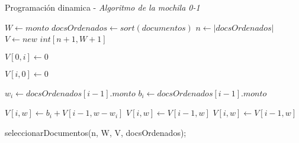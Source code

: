 \begin{algorithm}
    \caption{\label{fig: algortimoMochila}Programación dinamica - \textit{Algoritmo de la mochila 0-1}}
    \begin{algorithmic}[1]


    \vspace{3mm}
    \State $W \gets monto$
    \State $docsOrdenados\gets sort(documentos)$
    \State $n \gets |docsOrdenados|$
    \State $V \gets new$ $int[n + 1, W + 1]$

    \vspace{3mm}
        \State $V[0,i] \gets 0$
    \EndFor

    \vspace{3mm}
        \State $V[i,0] \gets 0$
    \EndFor

    \vspace{3mm}
            \State $w_{i} \gets docsOrdenados[i-1].monto$
            \State $b_{i} \gets docsOrdenados[i-1].monto$

                    \State $V[i,w] \gets b_{i} + V[i-1, w-w_{i}]$
                \Else
                    \State $V[i,w] \gets V[i-1,w]$
                \EndIf
            \Else
                \State $V[i,w] \gets V[i-1,w]$
            \EndIf
        \EndFor
    \EndFor

    \vspace{3mm}
    \State seleccionarDocumentos(n, W, V, docsOrdenados);
  \end{algorithmic}
\end{algorithm}



